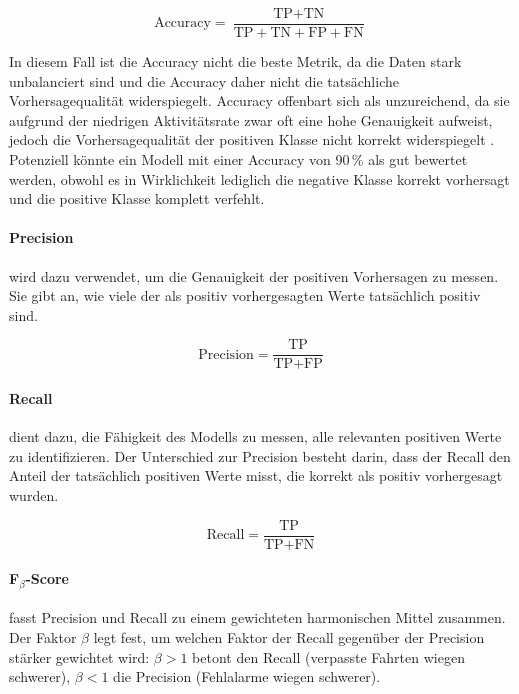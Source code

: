 \begin{equation}
\text{Accuracy} = \frac{\text{TP} + \text{TN}}{\text{TP} + \text{TN} + \text{FP} + \text{FN}} 
\end{equation}

In diesem Fall ist die Accuracy nicht die beste Metrik, da die Daten stark unbalanciert sind und die Accuracy daher nicht die tatsächliche Vorhersagequalität widerspiegelt. Accuracy offenbart sich als unzureichend, da sie aufgrund der niedrigen Aktivitätsrate zwar oft eine hohe Genauigkeit aufweist, jedoch die Vorhersagequalität der positiven Klasse nicht korrekt widerspiegelt \parencite{he2009imbalanced,saito2015prauc}. Potenziell könnte ein Modell mit einer Accuracy von 90\,\% als gut bewertet werden, obwohl es in Wirklichkeit lediglich die negative Klasse korrekt vorhersagt und die positive Klasse komplett verfehlt. 

\paragraph{Precision} wird dazu verwendet, um die Genauigkeit der positiven Vorhersagen zu messen. Sie gibt an, wie viele der als positiv vorhergesagten Werte tatsächlich positiv sind.

\begin{equation}
  \text{Precision} = \frac{\text{TP}}{\text{TP} + \text{FP}}
\end{equation}

\paragraph{Recall} dient dazu, die Fähigkeit des Modells zu messen, alle relevanten positiven Werte zu identifizieren. Der Unterschied zur Precision besteht darin, dass der Recall den Anteil der tatsächlich positiven Werte misst, die korrekt als positiv vorhergesagt wurden.

\begin{equation}
  \text{Recall} = \frac{\text{TP}}{\text{TP} + \text{FN}}
\end{equation}

\paragraph{F$_\beta$-Score} fasst Precision und Recall zu einem gewichteten harmonischen Mittel zusammen. Der Faktor $\beta$ legt fest, um welchen Faktor der Recall gegenüber der Precision stärker gewichtet wird: $\beta > 1$ betont den Recall (verpasste Fahrten wiegen schwerer), $\beta < 1$ die Precision (Fehlalarme wiegen schwerer).

